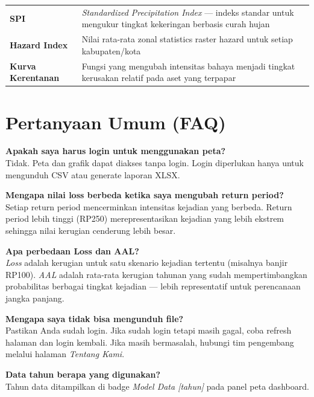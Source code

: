 \documentclass[12pt, a4paper]{article}
\begin{document}
\begin{center}
\begin{tabularx}{\textwidth}{@{} l X @{}}
    \textbf{SPI}            & \textit{Standardized Precipitation Index} — indeks standar
                              untuk mengukur tingkat kekeringan berbasis curah hujan \\[4pt]
    \textbf{Hazard Index}   & Nilai rata-rata zonal statistics raster hazard untuk
                              setiap kabupaten/kota \\[4pt]
    \textbf{Kurva Kerentanan} & Fungsi yang mengubah intensitas bahaya menjadi
                              tingkat kerusakan relatif pada aset yang terpapar \\
    \bottomrule
  \end{tabularx}
  \end{center}

  \newpage

  \section{Pertanyaan Umum (FAQ)}

  \textbf{Apakah saya harus login untuk menggunakan peta?}\\
  Tidak. Peta dan grafik dapat diakses tanpa login. Login diperlukan hanya untuk
  mengunduh CSV atau generate laporan XLSX.

  \medskip
  \textbf{Mengapa nilai loss berbeda ketika saya mengubah return period?}\\
  Setiap return period mencerminkan intensitas kejadian yang berbeda. Return period
  lebih tinggi (RP250) merepresentasikan kejadian yang lebih ekstrem sehingga nilai
  kerugian cenderung lebih besar.

  \medskip
  \textbf{Apa perbedaan Loss dan AAL?}\\
  \textit{Loss} adalah kerugian untuk satu skenario kejadian tertentu (misalnya banjir RP100).
  \textit{AAL} adalah rata-rata kerugian tahunan yang sudah mempertimbangkan probabilitas
  berbagai tingkat kejadian — lebih representatif untuk perencanaan jangka panjang.

  \medskip
  \textbf{Mengapa saya tidak bisa mengunduh file?}\\
  Pastikan Anda sudah login. Jika sudah login tetapi masih gagal, coba refresh halaman
  dan login kembali. Jika masih bermasalah, hubungi tim pengembang melalui halaman
  \textit{Tentang Kami}.

  \medskip
  \textbf{Data tahun berapa yang digunakan?}\\
  Tahun data ditampilkan di badge \textit{Model Data [tahun]} pada panel peta dashboard.
\end{document}
